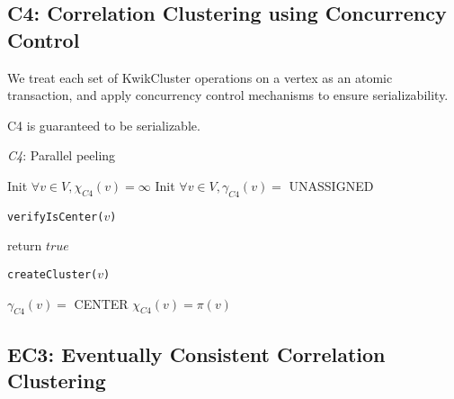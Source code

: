 \subsection{C4: Correlation Clustering using Concurrency Control}

We treat each set of KwikCluster operations on a vertex as an atomic transaction, and apply concurrency control mechanisms to ensure serializability.

C4 is guaranteed to be serializable.

      \begin{algorithm}[h]
        \DontPrintSemicolon
        \caption{{\it C4}: Parallel peeling}
        \label{alg:pargreedy}
        Init $\forall v\in V, \chi_{C4}(v) = \infty$\;
        Init $\forall v\in V, \gamma_{C4}(v) = $ UNASSIGNED\;
      \end{algorithm}

      \begin{algorithm}[h]
        \DontPrintSemicolon
        \caption{\texttt{verifyIsCenter($v$)}}
        \label{alg:verifyiscenter}
              return $true$
      \end{algorithm}
      \begin{algorithm}[h]
        \DontPrintSemicolon
        \caption{\texttt{createCluster($v$)}}
        \label{alg:createcluster}
        $\gamma_{C4}(v) = $ CENTER\;
        $\chi_{C4}(v) = \pi(v)$\;
      \end{algorithm}


\subsection{EC3: Eventually Consistent Correlation Clustering}

